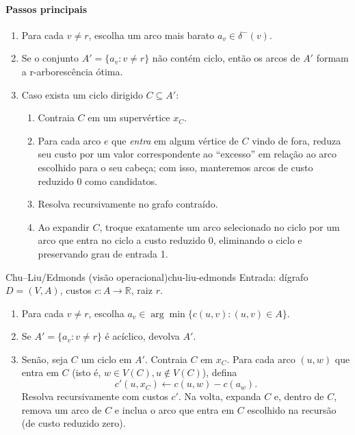 \documentclass[12pt,a4paper]{article}
\begin{document}
\paragraph{Passos principais}
\begin{enumerate}\setlength{\itemsep}{2pt}
    \item Para cada \(v\neq r\), escolha um arco mais barato \(a_v\in \delta^-(v)\).
    \item Se o conjunto \(A' = \{a_v : v\neq r\}\) não contém ciclo, então os arcos de \(A'\) formam a r-arborescência ótima.
    \item Caso exista um ciclo dirigido \(C\subseteq A'\):
    \begin{enumerate}\setlength{\itemsep}{1pt}
        \item Contraia \(C\) em um supervértice \(x_C\).
        \item Para cada arco \(e\) que \emph{entra} em algum vértice de \(C\) vindo de fora, reduza seu custo por um valor correspondente ao “excesso” em relação ao arco escolhido para o seu cabeça; com isso, manteremos arcos de custo reduzido \(0\) como candidatos.
        \item Resolva recursivamente no grafo contraído.
        \item Ao expandir \(C\), troque exatamente um arco selecionado no ciclo por um arco que entra no ciclo a custo reduzido \(0\), eliminando o ciclo e preservando grau de entrada 1.
    \end{enumerate}
\end{enumerate}

\begin{algobox}{Chu–Liu/Edmonds (visão operacional)}{chu-liu-edmonds}
Entrada: dígrafo \(D=(V,A)\), custos \(c:A\to\mathbb{R}\), raiz \(r\).
\begin{enumerate}\setlength{\itemsep}{2pt}
    \item Para cada \(v\neq r\), escolha \(a_v\in\arg\min\{c(u,v):(u,v)\in A\}\).
    \item Se \(A' = \{a_v: v\neq r\}\) é acíclico, devolva \(A'\).
    \item Senão, seja \(C\) um ciclo em \(A'\). Contraia \(C\) em \(x_C\). Para cada arco \((u,w)\) que entra em \(C\) (isto é, \(w\in V(C), u\notin V(C)\)), defina
    \[c'(u,x_C) \leftarrow c(u,w) - c(a_w).\]
    Resolva recursivamente com custos \(c'\). Na volta, expanda \(C\) e, dentro de \(C\), remova um arco de \(C\) e inclua o arco que entra em \(C\) escolhido na recursão (de custo reduzido zero).
\end{enumerate}
\end{algobox}
\end{document}
